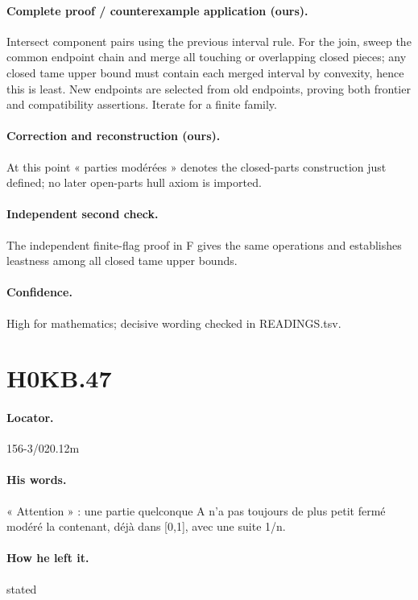 \paragraph{Complete proof / counterexample application (ours).} Intersect component pairs using the previous interval rule. For the join, sweep the common endpoint chain and merge all touching or overlapping closed pieces; any closed tame upper bound must contain each merged interval by convexity, hence this is least. New endpoints are selected from old endpoints, proving both frontier and compatibility assertions. Iterate for a finite family.

\paragraph{Correction and reconstruction (ours).} At this point « parties modérées » denotes the closed-parts construction just defined; no later open-parts hull axiom is imported.

\paragraph{Independent second check.} The independent finite-flag proof in F gives the same operations and establishes leastness among all closed tame upper bounds.

\paragraph{Confidence.} High for mathematics; decisive wording checked in READINGS.tsv.

\section*{H0KB.47}\label{statement:H0KB.47}
\paragraph{Locator.} 156-3/020.12m

\paragraph{His words.} « Attention » : une partie quelconque A n’a pas toujours de plus petit fermé modéré la contenant, déjà dans [0,1], avec une suite 1/n.

\paragraph{How he left it.} stated

